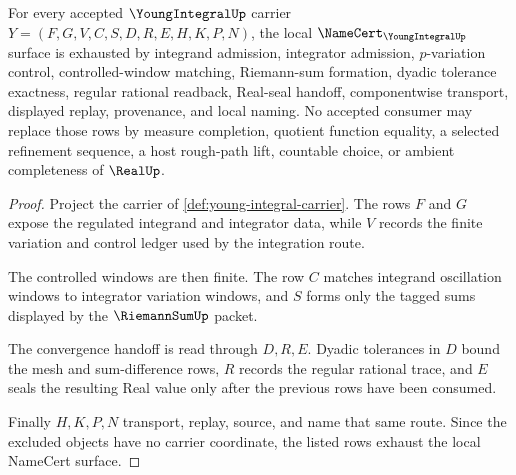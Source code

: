 \begin{theorem}
\label{thm:young-integral-namecert-obligations}
For every accepted $\YoungIntegralUp$ carrier $Y=(F,G,V,C,S,D,R,E,H,K,P,N)$, the local $\NameCert_{\YoungIntegralUp}$ surface is exhausted by integrand admission, integrator admission, $p$-variation control, controlled-window matching, Riemann-sum formation, dyadic tolerance exactness, regular rational readback, Real-seal handoff, componentwise transport, displayed replay, provenance, and local naming. No accepted consumer may replace those rows by measure completion, quotient function equality, a selected refinement sequence, a host rough-path lift, countable choice, or ambient completeness of $\RealUp$.
\end{theorem}
\begin{proof}
Project the carrier of \autoref{def:young-integral-carrier}. The rows $F$ and $G$ expose the regulated integrand and integrator data, while $V$ records the finite variation and control ledger used by the integration route.

The controlled windows are then finite. The row $C$ matches integrand oscillation windows to integrator variation windows, and $S$ forms only the tagged sums displayed by the $\RiemannSumUp$ packet.

The convergence handoff is read through $D,R,E$. Dyadic tolerances in $D$ bound the mesh and sum-difference rows, $R$ records the regular rational trace, and $E$ seals the resulting Real value only after the previous rows have been consumed.

Finally $H,K,P,N$ transport, replay, source, and name that same route. Since the excluded objects have no carrier coordinate, the listed rows exhaust the local NameCert surface.
\end{proof}

